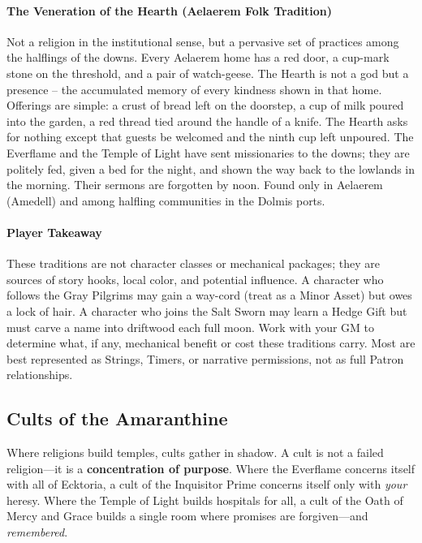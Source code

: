 \paragraph{The Veneration of the Hearth (Aelaerem Folk Tradition)}
Not a religion in the institutional sense, but a pervasive set of practices among the halflings of the downs. Every Aelaerem home has a red door, a cup-mark stone on the threshold, and a pair of watch-geese. The Hearth is not a god but a presence -- the accumulated memory of every kindness shown in that home. Offerings are simple: a crust of bread left on the doorstep, a cup of milk poured into the garden, a red thread tied around the handle of a knife. The Hearth asks for nothing except that guests be welcomed and the ninth cup left unpoured. The Everflame and the Temple of Light have sent missionaries to the downs; they are politely fed, given a bed for the night, and shown the way back to the lowlands in the morning. Their sermons are forgotten by noon. Found only in Aelaerem (Amedell) and among halfling communities in the Dolmis ports.

\paragraph{Player Takeaway}
These traditions are not character classes or mechanical packages; they are sources of story hooks, local color, and potential influence. A character who follows the Gray Pilgrims may gain a way-cord (treat as a Minor Asset) but owes a lock of hair. A character who joins the Salt Sworn may learn a Hedge Gift but must carve a name into driftwood each full moon. Work with your GM to determine what, if any, mechanical benefit or cost these traditions carry. Most are best represented as Strings, Timers, or narrative permissions, not as full Patron relationships.

\subsection{Cults of the Amaranthine}
\label{subsec:cults}

Where religions build temples, cults gather in shadow. A cult is not a failed religion---it is a \textbf{concentration of purpose}. Where the Everflame concerns itself with all of Ecktoria, a cult of the Inquisitor Prime concerns itself only with \textit{your} heresy. Where the Temple of Light builds hospitals for all, a cult of the Oath of Mercy and Grace builds a single room where promises are forgiven---and \textit{remembered}.

